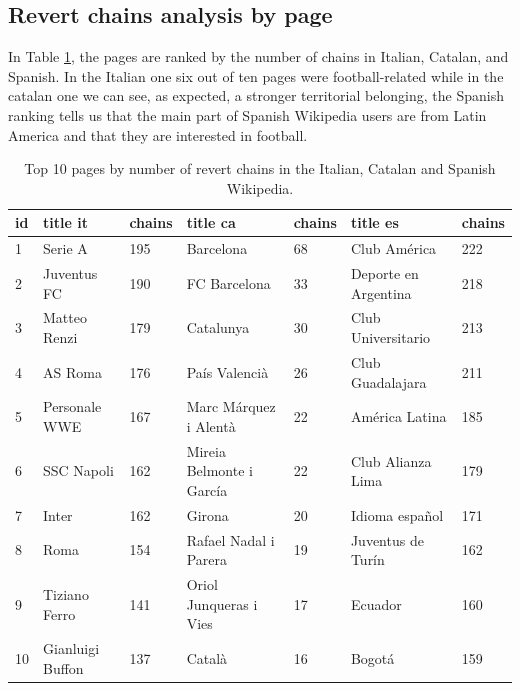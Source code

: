 \subsection{Revert chains analysis by page}
In Table \ref{table:morechains}, the pages are ranked by the number of chains in Italian, Catalan,
and Spanish. In the Italian one six out of ten pages were football-related while in the catalan one
we can see, as expected, a stronger territorial belonging, the Spanish ranking tells us that the
main part of Spanish Wikipedia users are from Latin America and that they are interested in
football. 
\begin{table}[H]
    \centering
    \begin{tabularx}{\columnwidth}{@{}Xll|ll|ll@{}}
        \midrule
        \textbf{id} & \textbf{title it} & \textbf{chains}& \textbf{title ca} & \textbf{chains}&\textbf{title es} & \textbf{chains} \\ \toprule
        1 & Serie A & 195  & Barcelona & 68 & Club América & 222\\
        2 & Juventus FC & 190  & FC Barcelona & 33 & Deporte en Argentina & 218\\
        3 & Matteo Renzi & 179  & Catalunya & 30 & Club Universitario & 213\\
        4 & AS Roma & 176  &País Valencià& 26 & Club Guadalajara & 211\\
        5 & Personale WWE & 167  &Marc Márquez i Alentà & 22 & América Latina & 185\\
        6 & SSC Napoli & 162  & Mireia Belmonte i García& 22 & Club Alianza Lima & 179\\
        7 & Inter  & 162  &Girona & 20 & Idioma español & 171\\
        8 & Roma & 154 & Rafael Nadal i Parera & 19 & Juventus de Turín & 162\\
        9 & Tiziano Ferro & 141 & Oriol Junqueras i Vies& 17 & Ecuador & 160\\
        10 & Gianluigi Buffon & 137  &Català & 16 & Bogotá & 159\\
        
         \bottomrule
    \end{tabularx}
    
    \caption{Top 10 pages by number of revert chains in the Italian, Catalan and Spanish Wikipedia. \label{table:morechains}}
\end{table}


